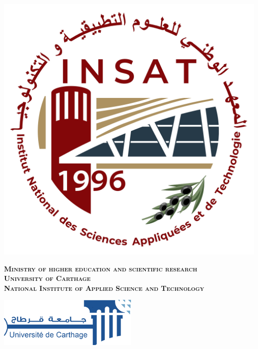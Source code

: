 \thispagestyle{empty}%
\hspace{-1cm}
\begin{minipage}[l]{0.2\columnwidth}
\includegraphics[width=1.1\columnwidth]{figures/LogoINSAT.png}\\
\end{minipage}
\hfill
\begin{minipage}[l]{0.6\columnwidth}
\centering
\footnotesize
\textbf{\textsc{Ministry of higher education and scientific research}}\\
\textbf{\textsc{University of Carthage}}\\
\textbf{\textsc{National Institute of Applied Science and Technology}}
\end{minipage}
\hfill
\begin{minipage}[l]{0.2\columnwidth}
\includegraphics[width=1.1\columnwidth]{figures/LogoUniCarthage.png}\\
\end{minipage}
